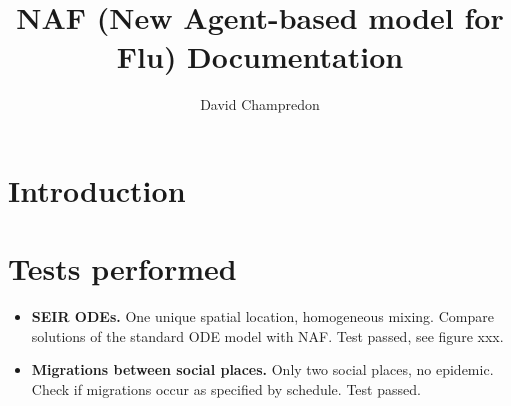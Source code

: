 \documentclass[11pt, onecolumn]{article}
\title{\textsf{NAF} (New Agent-based model for Flu) Documentation}
\author{David Champredon}
\newcommand{\naf}{\textsf{NAF}}
\begin{document}
\maketitle

\vspace{1cm}

\tableofcontents


\section{Introduction}

\section{Tests performed}

\begin{itemize}
\item \textbf{SEIR ODEs.} One unique spatial location, homogeneous mixing. Compare solutions of the standard ODE model with \naf. Test passed, see figure xxx.
\item \textbf{Migrations between social places.} Only two social places, no epidemic. Check if migrations occur as specified by schedule. Test passed. 
\end{itemize}



\end{document}
